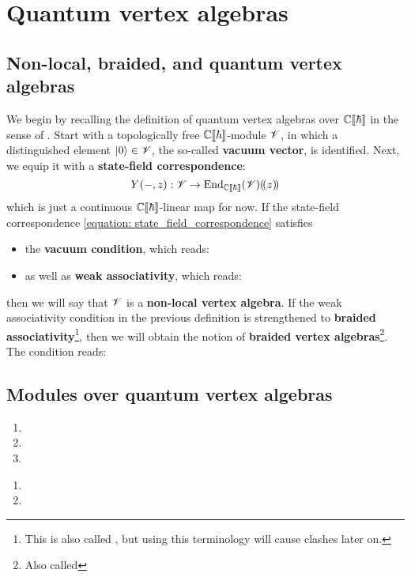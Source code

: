 \section{Quantum vertex algebras} \label{section: quantum_vertex_algebras}
    \subsection{Non-local, braided, and quantum vertex algebras}
        We begin by recalling the definition of quantum vertex algebras over $\mathbb{C}[\![\hbar]\!]$ in the sense of \cite{etingof_kazhdan_quantisation_5}. Start with a topologically free $\mathbb{C}[\![\hbar]\!]$-module $\mathscr{V}$, in which a distinguished element $\lvert {0} \rangle \in \mathscr{V}$, the so-called \textbf{vacuum vector}, is identified. Next, we equip it with a \textbf{state-field correspondence}:
            \begin{equation} \label{equation: state_field_correspondence}
                Y(-, z): \mathscr{V} \to \operatorname{End}_{\mathbb{C}[\![\hbar]\!]}(\mathscr{V})(\!(z)\!)
            \end{equation}
        which is just a continuous $\mathbb{C}[\![\hbar]\!]$-linear map for now. If the state-field correspondence \eqref{equation: state_field_correspondence} satisfies \:
        \begin{itemize}
            \item the \textbf{vacuum condition}, which reads:
            \item as well as \textbf{weak associativity}, which reads:
        \end{itemize}
        then we will say that $\mathscr{V}$ is a \textbf{non-local vertex algebra}. If the weak associativity condition in the previous definition is strengthened to \textbf{braided associativity}\footnote{This is also called , but using this terminology will cause clashes later on.}, then we will obtain the notion of \textbf{braided vertex algebras}\footnote{Also called }. The condition reads:

        \begin{definition} \label{def: quantum_vertex_algebras}
            
        \end{definition}

    \subsection{Modules over quantum vertex algebras}
        \begin{definition} \label{def: formal_quantum_vertex_algebra_(quasi)_modules}
            \begin{enumerate}
                \item 
                \item 
                \item 
            \end{enumerate}
        \end{definition}
    
        \begin{definition} \label{def: formal_quantum_vertex_algebra_deformed_(quasi)_modules}
            \begin{enumerate}
                \item 
                \item 
            \end{enumerate}
        \end{definition}